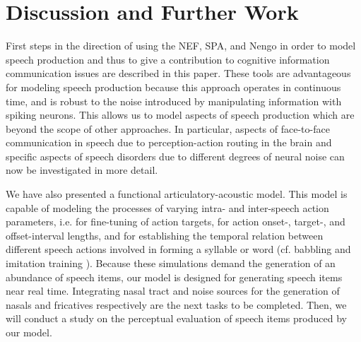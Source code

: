 \documentclass[conference]{IEEEtran}
\begin{document}
\section{Discussion and Further Work}

First steps in the direction of using the NEF, SPA, and Nengo
in order to model speech production and thus to give a contribution
to cognitive information communication issues
\cite{Baranyi2012} are
described in this paper. These tools are advantageous
for modeling speech production because this
approach operates in continuous time, and is robust to the
noise introduced by manipulating information with spiking neurons.
This allows us to model aspects of speech production
which are beyond the scope of other approaches. In particular,
aspects of face-to-face communication in speech due to
perception-action routing in the brain and specific aspects of speech
disorders due to different degrees of neural noise
can now be investigated in more detail.

We have also presented a functional articulatory-acoustic model.
This model is capable of modeling the processes of varying
intra- and inter-speech action parameters, i.e. for fine-tuning of
action targets, for action onset-, target-, and offset-interval
lengths, and for establishing the temporal relation between
different speech actions involved in
forming a syllable or word (cf. babbling and
imitation training \cite{kroger2009,kroger2014}). Because these
simulations demand the generation of an abundance of speech items,
our model is designed for generating speech items near real time.
Integrating nasal tract and noise sources for the generation of nasals
and fricatives respectively are the next tasks to be completed.
Then, we will conduct a study on the perceptual evaluation
of speech items produced by our model.




\end{document}
